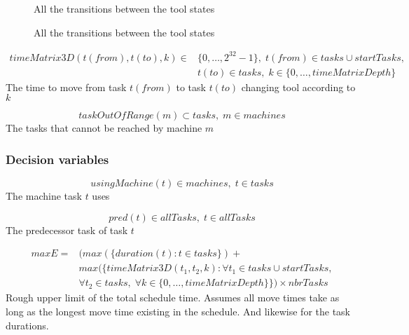  \begin{figure}
 	\centering
 	
 	\caption{All the transitions between the tool states}
 	\label{fig:tools_trans_bef}
 \end{figure}
 \begin{figure}
 	\centering
  	
  	\caption{All the transitions between the tool states}
  	\label{fig:tools_trans_aft}
 \end{figure}
 
 \begin{equation}
 \begin{aligned}\label{eq:44}
 timeMatrix3D(t(from),t(to),k) \in &\{0 , \ldots , 2^{32}-1\}, \; t(from) \in tasks \cup startTasks,  \\ 
 &t(to) \in tasks, \; k \in \{0 , \ldots , timeMatrixDepth\}
 \end{aligned}
 \end{equation}
 The time to move from task $t(from)$ to task $t(to)$ changing tool according to $k$
 
 \begin{equation}\label{eq:56}
 taskOutOfRange(m) \subset tasks, \; m \in machines\end{equation}
 The tasks that cannot be reached by machine $m$
 
 
 \subsubsection{Decision variables}
 
 \begin{equation}\label{eq:40}
 usingMachine(t) \in machines, \; t \in tasks\end{equation}
 The machine task $t$ uses
 
 \begin{equation}\label{eq:41}
 pred(t) \in allTasks, \; t \in allTasks\end{equation}
 The predecessor task of task $t$
 
 \begin{equation}
 \begin{aligned}\label{eq:45}
 maxE = &(max(\{duration(t) : t \in tasks\}) +  \\ 
 &max(\{timeMatrix3D(t_1,t_2,k) : \forall t_1 \in tasks \cup startTasks,  \\ 
 &\forall t_2 \in tasks, \; \forall k \in \{0 , \ldots , timeMatrixDepth\}\}) \times nbrTasks
 \end{aligned}
 \end{equation}
 Rough upper limit of the total schedule time. Assumes all move times take as long as the longest move time existing in the schedule. And likewise for the task durations.
 
